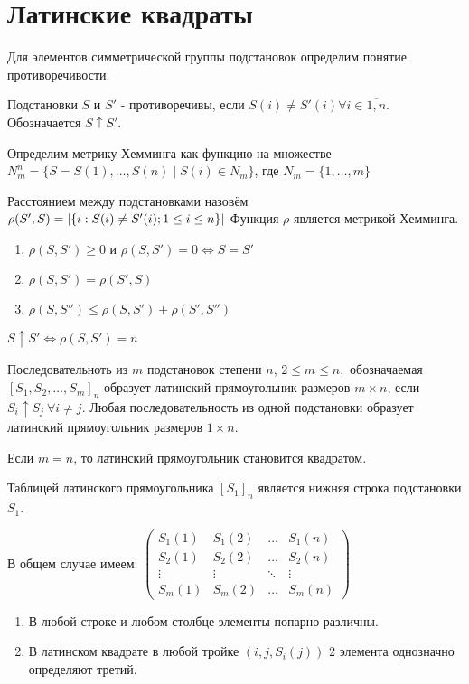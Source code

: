 \section{Латинские квадраты}

Для элементов симметрической группы подстановок определим понятие противоречивости.

\opr Подстановки $S$ и $S'$ - противоречивы, если $S(i) \neq S'(i) \forall i \in \overline{1,n}$. Обозначается $S\uparrow S'$.

Определим метрику Хемминга как функцию на множестве $N_m^n = \{ S = S(1), \dotsc,S(n) \mid S(i) \in N_m\}$, где $N_m = \{1, \ldots, m\}$\par
Расстоянием между подстановками назовём $\rho(S',S) = \left|\{i : S(i) \neq S'(i); 
\newline 1 \leq i \leq n\}\right|$
Функция $\rho$ является метрикой Хемминга.

\prop
\begin{enumerate}
	\item $\rho(S,S') \geq 0$ и $\rho(S,S') = 0 \Leftrightarrow S = S'$
	\item $\rho(S,S') = \rho(S',S)$
	\item $\rho(S,S'') \leq \rho(S,S') + \rho(S',S'')$
\end{enumerate}

\utv $S \uparrow S' \Leftrightarrow \rho(S,S')=n$

\opr Последовательноть из $m$ подстановок степени $n$, $2\leq m\leq n,$ обозначаемая \newline$[S_1, S_2, \dotsc, S_m]_n$ образует латинский прямоугольник размеров $m\times n$, если $S_i\uparrow S_j \:\forall i\neq j$.
Любая последовательность из одной подстановки образует латинский прямоугольник размеров $1\times n$.

Если $m=n$, то латинский прямоугольник становится квадратом.

Таблицей латинского прямоугольника $[S_1]_n$ является нижняя строка подстановки $S_1$. \par
В общем случае имеем:
$\begin{pmatrix}
S_1(1) & S_1(2) & \dotsc & S_1(n)\\
S_2(1) & S_2(2) & \dotsc & S_2(n)\\
\vdots & \vdots  & \ddots   & \vdots  \\
S_m(1) & S_m(2) & \dotsc & S_m(n)
\end{pmatrix}$\par

\prop
\begin{enumerate}
	\item В любой строке и любом столбце элементы попарно различны.
	\item В латинском квадрате в любой тройке $(i, j, S_i(j))$ 2 элемента однозначно определяют третий.
\end{enumerate}

